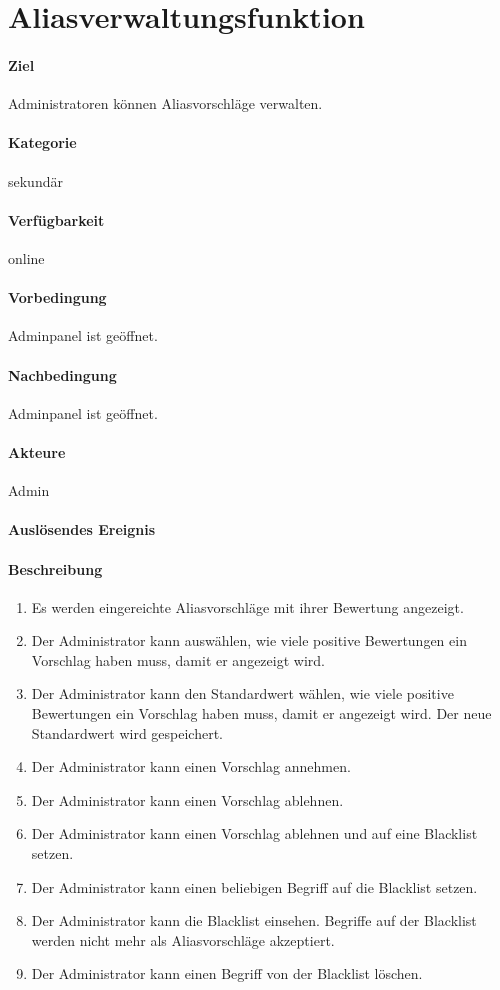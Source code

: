 \section{Aliasverwaltungsfunktion}
\label{Aliasverwaltungsfunktion}
\paragraph{Ziel}
Administratoren können Aliasvorschläge verwalten.
\paragraph{Kategorie}
sekundär
\paragraph{Verfügbarkeit}
online
\paragraph{Vorbedingung}
Adminpanel ist geöffnet.
\paragraph{Nachbedingung}
Adminpanel ist geöffnet.
\paragraph{Akteure}
Admin
\paragraph{Auslösendes Ereignis}

\paragraph{Beschreibung}
\begin{enumerate}
    \item Es werden eingereichte Aliasvorschläge mit ihrer Bewertung angezeigt.
    \item Der Administrator kann auswählen, wie viele positive Bewertungen ein Vorschlag haben muss, damit er angezeigt wird.
    \item Der Administrator kann den Standardwert wählen, wie viele positive Bewertungen ein Vorschlag haben muss, damit er angezeigt wird. Der neue Standardwert wird gespeichert.
    \item Der Administrator kann einen Vorschlag annehmen.
    \item Der Administrator kann einen Vorschlag ablehnen.
    \item Der Administrator kann einen Vorschlag ablehnen und auf eine Blacklist setzen.
    \item Der Administrator kann einen beliebigen Begriff auf die Blacklist setzen.
    \item Der Administrator kann die Blacklist einsehen. Begriffe auf der Blacklist werden nicht mehr als Aliasvorschläge akzeptiert.
    \item Der Administrator kann einen Begriff von der Blacklist löschen.
\end{enumerate}